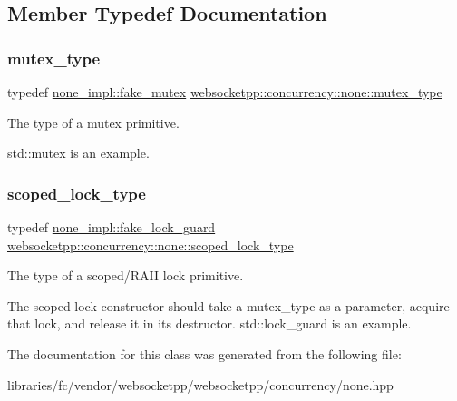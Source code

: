 \subsection{Member Typedef Documentation}
\mbox{\label{classwebsocketpp_1_1concurrency_1_1none_a3cf002cfc62e64e920a91a06f5e6fbc3}} 
\subsubsection{\texorpdfstring{mutex\+\_\+type}{mutex\_type}}
{\footnotesize\ttfamily typedef \mbox{\hyperlink{classwebsocketpp_1_1concurrency_1_1none__impl_1_1fake__mutex}{none\+\_\+impl\+::fake\+\_\+mutex}} \mbox{\hyperlink{classwebsocketpp_1_1concurrency_1_1none_a3cf002cfc62e64e920a91a06f5e6fbc3}{websocketpp\+::concurrency\+::none\+::mutex\+\_\+type}}}



The type of a mutex primitive. 

std\+::mutex is an example. \mbox{\label{classwebsocketpp_1_1concurrency_1_1none_af2d121eeb6202694819578ba4bb00d3e}} 
\subsubsection{\texorpdfstring{scoped\+\_\+lock\+\_\+type}{scoped\_lock\_type}}
{\footnotesize\ttfamily typedef \mbox{\hyperlink{classwebsocketpp_1_1concurrency_1_1none__impl_1_1fake__lock__guard}{none\+\_\+impl\+::fake\+\_\+lock\+\_\+guard}} \mbox{\hyperlink{classwebsocketpp_1_1concurrency_1_1none_af2d121eeb6202694819578ba4bb00d3e}{websocketpp\+::concurrency\+::none\+::scoped\+\_\+lock\+\_\+type}}}



The type of a scoped/\+R\+A\+II lock primitive. 

The scoped lock constructor should take a mutex\+\_\+type as a parameter, acquire that lock, and release it in its destructor. std\+::lock\+\_\+guard is an example. 

The documentation for this class was generated from the following file\+:\begin{DoxyCompactItemize}
\item 
libraries/fc/vendor/websocketpp/websocketpp/concurrency/none.\+hpp\end{DoxyCompactItemize}
